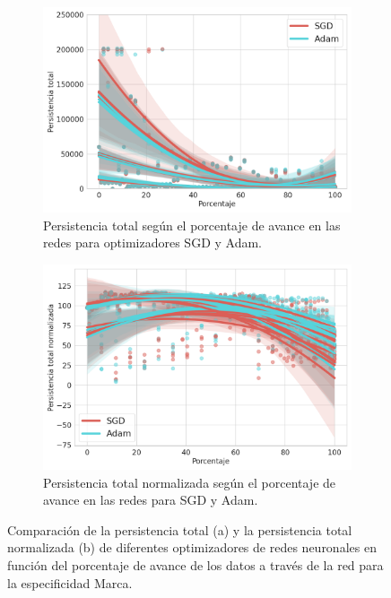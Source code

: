 \begin{figure}[H]
	\centering
	\begin{subfigure}
		{.5\textwidth}
		\centering
		\includegraphics[width=\linewidth]{img/m_optim.png}
		\caption{Persistencia total según el porcentaje de avance en las redes para
			optimizadores SGD y Adam.}
		\label{fig:m-homology-optim-1}
	\end{subfigure}%
	\begin{subfigure}
		{.5\textwidth}
		\centering
		\includegraphics[width=\linewidth]{img/m_optim_norm.png}
		\caption{Persistencia total normalizada según el porcentaje de avance en las
			redes para SGD y Adam.}
		\label{fig:m-homology-optim-2}
	\end{subfigure}
	\caption{Comparación de la persistencia total (a) y la persistencia total
		normalizada (b) de diferentes optimizadores de redes neuronales en función del
		porcentaje de avance de los datos a través de la red para la especificidad
		Marca.}
	\label{fig:m-homology-optim}
\end{figure}

